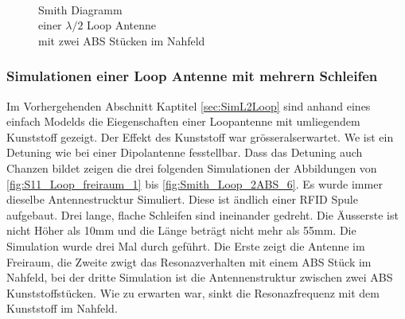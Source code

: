 \begin{figure}[!h]
\begin{center}
  	\caption{\\Smith Diagramm \\einer $\lambda/2$ Loop Antenne \\ mit zwei ABS Stücken im Nahfeld}		\label{fig:Smith_Lambda2_Loop_2ABS_6}
	\endminipage
	\end{center}
\end{figure}
\subsubsection{Simulationen einer Loop Antenne mit mehrern Schleifen}
Im Vorhergehenden Abschnitt Kaptitel \ref{sec:SimL2Loop} sind anhand eines einfach Modelds die Eiegenschaften einer Loopantenne mit umliegendem Kunststoff gezeigt. Der Effekt des Kunststoff war grösseralserwartet. We ist ein Detuning wie bei einer Dipolantenne fesstellbar. Dass das Detuning auch Chanzen bildet zeigen die drei folgenden Simulationen der Abbildungen von \ref{fig:S11_Loop_freiraum_1} bis \ref{fig:Smith_Loop_2ABS_6}. Es wurde immer dieselbe Antennestrucktur Simuliert. Diese ist ändlich einer RFID Spule aufgebaut. Drei lange, flache Schleifen sind ineinander gedreht. Die Äusserste ist nicht Höher als 10mm und die Länge beträgt nicht mehr als 55mm. Die Simulation wurde drei Mal durch geführt. Die Erste zeigt die Antenne im Freiraum, die Zweite zwigt das Resonazverhalten mit einem ABS Stück im Nahfeld, bei der dritte Simulation ist die Antennenstruktur zwischen zwei ABS Kunststoffstücken. Wie zu erwarten war, sinkt die Resonazfrequenz mit dem Kunststoff im Nahfeld. 
